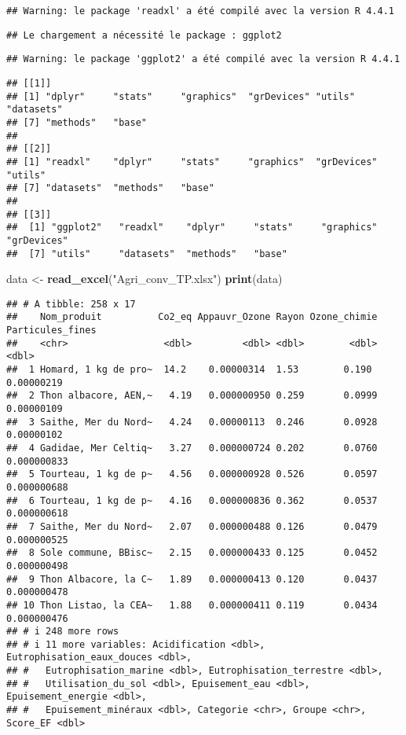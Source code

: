 \documentclass[
]{article}
\newenvironment{Shaded}{\begin{snugshade}}{\end{snugshade}}
\newcommand{\FunctionTok}[1]{\textcolor[rgb]{0.13,0.29,0.53}{\textbf{#1}}}
\newcommand{\NormalTok}[1]{#1}
\newcommand{\OtherTok}[1]{\textcolor[rgb]{0.56,0.35,0.01}{#1}}
\newcommand{\StringTok}[1]{\textcolor[rgb]{0.31,0.60,0.02}{#1}}
\begin{document}
\begin{verbatim}
## Warning: le package 'readxl' a été compilé avec la version R 4.4.1
\end{verbatim}

\begin{verbatim}
## Le chargement a nécessité le package : ggplot2
\end{verbatim}

\begin{verbatim}
## Warning: le package 'ggplot2' a été compilé avec la version R 4.4.1
\end{verbatim}

\begin{verbatim}
## [[1]]
## [1] "dplyr"     "stats"     "graphics"  "grDevices" "utils"     "datasets" 
## [7] "methods"   "base"     
## 
## [[2]]
## [1] "readxl"    "dplyr"     "stats"     "graphics"  "grDevices" "utils"    
## [7] "datasets"  "methods"   "base"     
## 
## [[3]]
##  [1] "ggplot2"   "readxl"    "dplyr"     "stats"     "graphics"  "grDevices"
##  [7] "utils"     "datasets"  "methods"   "base"
\end{verbatim}

\begin{Shaded}
\begin{Highlighting}[]
\NormalTok{data }\OtherTok{\textless{}{-}} \FunctionTok{read\_excel}\NormalTok{(}\StringTok{"Agri\_conv\_TP.xlsx"}\NormalTok{)}
\FunctionTok{print}\NormalTok{(data)}
\end{Highlighting}
\end{Shaded}

\begin{verbatim}
## # A tibble: 258 x 17
##    Nom_produit          Co2_eq Appauvr_Ozone Rayon Ozone_chimie Particules_fines
##    <chr>                 <dbl>         <dbl> <dbl>        <dbl>            <dbl>
##  1 Homard, 1 kg de pro~  14.2    0.00000314  1.53        0.190       0.00000219 
##  2 Thon albacore, AEN,~   4.19   0.000000950 0.259       0.0999      0.00000109 
##  3 Saithe, Mer du Nord~   4.24   0.00000113  0.246       0.0928      0.00000102 
##  4 Gadidae, Mer Celtiq~   3.27   0.000000724 0.202       0.0760      0.000000833
##  5 Tourteau, 1 kg de p~   4.56   0.000000928 0.526       0.0597      0.000000688
##  6 Tourteau, 1 kg de p~   4.16   0.000000836 0.362       0.0537      0.000000618
##  7 Saithe, Mer du Nord~   2.07   0.000000488 0.126       0.0479      0.000000525
##  8 Sole commune, BBisc~   2.15   0.000000433 0.125       0.0452      0.000000498
##  9 Thon Albacore, la C~   1.89   0.000000413 0.120       0.0437      0.000000478
## 10 Thon Listao, la CEA~   1.88   0.000000411 0.119       0.0434      0.000000476
## # i 248 more rows
## # i 11 more variables: Acidification <dbl>, Eutrophisation_eaux_douces <dbl>,
## #   Eutrophisation_marine <dbl>, Eutrophisation_terrestre <dbl>,
## #   Utilisation_du_sol <dbl>, Epuisement_eau <dbl>, Epuisement_energie <dbl>,
## #   Epuisement_minéraux <dbl>, Categorie <chr>, Groupe <chr>, Score_EF <dbl>
\end{verbatim}
\end{document}

